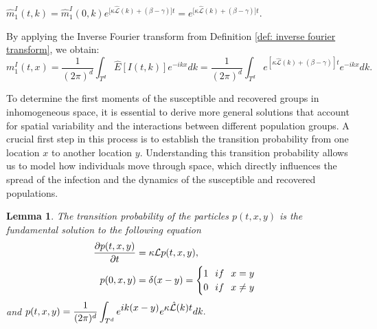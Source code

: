 \documentclass[sn-basic]{sn-jnl}%
\theoremstyle{thmstyleone}%
\theoremstyle{thmstyletwo}%
\newtheorem{lemma}{Lemma}
\theoremstyle{thmstylethree}%
\numberwithin{equation}{theorem}
\begin{document}
$\hat{m}_{1}^{I}(t,k) =  \hat{m}_{1}^{I}(0,k) e^{\displaystyle \big[\kappa \hat{\mathcal{L}}(k) + (\beta - \gamma)\big]t} = e^{\displaystyle \big[\kappa \hat{\mathcal{L}}(k) + (\beta - \gamma)\big]t}$. 

By applying the Inverse Fourier transform from Definition \ref{def: inverse fourier transform}, we obtain:
$$m_{1}^{I}(t,x) = \displaystyle \frac{1}{(2 \pi)^{d}} \int_{T^{d}} \hat{E}[I(t,k)] e^{\displaystyle -ikx} dk = \displaystyle \frac{1}{(2 \pi)^{d}} \int_{T^{d}} e^{\displaystyle [\kappa \hat{\mathcal{L}}(k) + (\beta - \gamma)]t} e^{\displaystyle -ikx} dk.$$

To determine the first moments of the susceptible and recovered groups in inhomogeneous space, it is essential to derive more general solutions that account for spatial variability and the interactions between different population groups. A crucial first step in this process is to establish the transition probability from one location 
$x$ to another location $y$. Understanding this transition probability allows us to model how individuals move through space, which directly influences the spread of the infection and the dynamics of the susceptible and recovered populations.
\begin{lemma} \label{lemma: transition probability}
The transition probability of the particles $p(t,x,y)$ is the fundamental solution to the following equation
\begin{align}
\displaystyle \frac{\partial \mathnormal{p}(t,x,y)}{\partial t} &= \kappa \mathcal{L} \mathnormal{p} (t,x,y),\\
\mathnormal{p}(0,x,y) &= \delta (x-y) = \begin{cases} 
1 \hspace{.25cm} if \hspace{.25cm} x=y\\
0 \hspace{.25cm} if \hspace{.25cm} x \neq y
\end{cases}
\end{align}
and $\mathnormal{p}(t,x,y) = \displaystyle \frac{1}{(2 \pi)^d} \int_{T^{d}} e^{\displaystyle ik(x-y)} e^{\displaystyle \kappa \hat{\mathcal{L}}(k) t} dk.$
\end{lemma}
\end{document}
